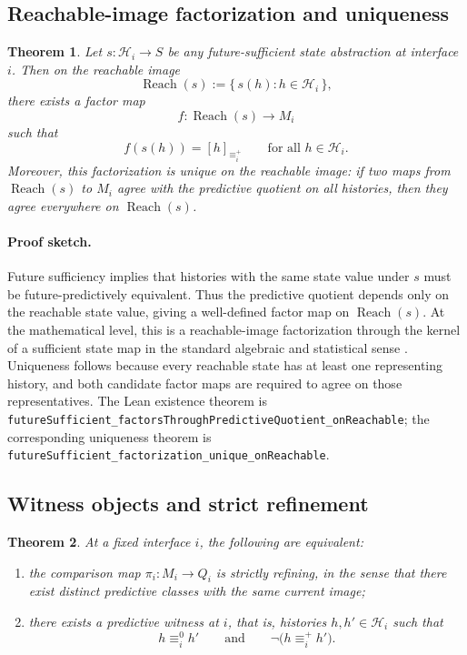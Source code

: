 \documentclass[11pt]{article}
\newcommand{\CurrentQ}{Q}
\newcommand{\PredictiveQ}{M}
\newcommand{\Histories}{\mathcal{H}}
\newcommand{\CurrentEquiv}{\equiv^{0}}
\newcommand{\FutureEquiv}{\equiv^{+}}
\newtheorem{theorem}{Theorem}[section]
\theoremstyle{definition}
\begin{document}
\subsection{Reachable-image factorization and uniqueness}\label{subsec:thm-factorization}
\begin{theorem}\label{thm:reachable-factorization}
Let $s : \Histories_i \to S$ be any future-sufficient state abstraction at interface $i$. Then on the reachable image
\[
\operatorname{Reach}(s) := \{\,s(h) : h\in\Histories_i\,\},
\]
there exists a factor map
\[
f : \operatorname{Reach}(s) \to \PredictiveQ_i
\]
such that
\[
f(s(h)) = [h]_{\FutureEquiv_i}
\qquad
\text{for all } h\in\Histories_i.
\]
Moreover, this factorization is unique on the reachable image: if two maps from $\operatorname{Reach}(s)$ to $\PredictiveQ_i$ agree with the predictive quotient on all histories, then they agree everywhere on $\operatorname{Reach}(s)$.
\end{theorem}

\paragraph{Proof sketch.}
Future sufficiency implies that histories with the same state value under $s$ must be future-predictively equivalent. Thus the predictive quotient depends only on the reachable state value, giving a well-defined factor map on $\operatorname{Reach}(s)$. At the mathematical level, this is a reachable-image factorization through the kernel of a sufficient state map in the standard algebraic and statistical sense \citep{BurrisSankappanavar1981CourseUniversalAlgebra,LehmannCasella1998TheoryPointEstimation}. Uniqueness follows because every reachable state has at least one representing history, and both candidate factor maps are required to agree on those representatives. The Lean existence theorem is \texttt{futureSufficient\_factorsThroughPredictiveQuotient\_onReachable}; the corresponding uniqueness theorem is \texttt{futureSufficient\_factorization\_unique\_onReachable}.

\subsection{Witness objects and strict refinement}\label{subsec:thm-witnesses}
\begin{theorem}\label{thm:witness-strict-refinement}
At a fixed interface $i$, the following are equivalent:
\begin{enumerate}
\item the comparison map $\pi_i : \PredictiveQ_i \to \CurrentQ_i$ is strictly refining, in the sense that there exist distinct predictive classes with the same current image;
\item there exists a predictive witness at $i$, that is, histories $h,h'\in\Histories_i$ such that
\[
h \CurrentEquiv_i h'
\qquad\text{and}\qquad
\neg\bigl(h \FutureEquiv_i h'\bigr).
\]
\end{enumerate}
\end{theorem}
\end{document}
